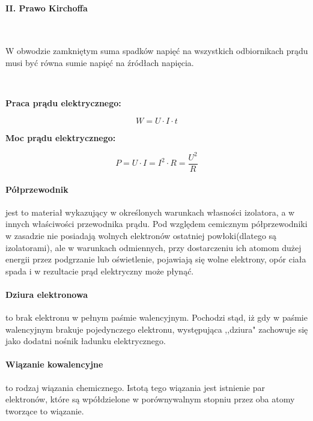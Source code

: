 \documentclass{article}
\begin{document}
            \paragraph{II. Prawo Kirchoffa}
            
            \
            
            W obwodzie zamkniętym suma spadków napięć na wszystkich
            odbiornikach prądu musi być równa sumie napięć na źródłach
            napięcia.

            \
            

            \textbf{Praca prądu elektrycznego:}

            \begin{equation}
                W = U \cdotp I \cdotp t
            \end{equation}

            \textbf{Moc prądu elektrycznego:}
            
            \begin{equation}
                P = U \cdotp I = I^2 \cdotp R = \frac{U^2}{R}
            \end{equation}

            \paragraph{Półprzewodnik}
            jest to materiał wykazujący w określonych warunkach
            własności izolatora, a w innych właściwości przewodnika prądu.
            Pod względem cemicznym półprzewodniki w zasadzie nie posiadają
            wolnych elektronów ostatniej powłoki(dlatego są izolatorami),
            ale w warunkach odmiennych, przy dostarczeniu ich atomom
            dużej energii przez podgrzanie lub oświetlenie, pojawiają się
            wolne elektrony, opór ciała spada i w rezultacie prąd elektryczny
            może płynąć.

            \paragraph{Dziura elektronowa}
            to brak elektronu w pełnym paśmie walencyjnym.
            Pochodzi stąd, iż gdy w paśmie walencyjnym brakuje pojedynczego
            elektronu, występująca ,,dziura" zachowuje się jako dodatni
            nośnik ładunku elektrycznego. 

            \paragraph{Wiązanie kowalencyjne}
            to rodzaj wiązania chemicznego. Istotą tego wiązania jest
            istnienie par elektronów, które są wpółdzielone w porównywalnym
            stopniu przez oba atomy tworzące to wiązanie.
\end{document}
